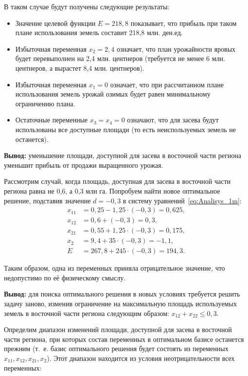 В таком случае будут получены следующие результаты:
\begin{itemize}
\item Значение целевой функции $ E = 218{,}8 $ показывает, что прибыль при таком
  плане использования земель составит 218{,}8 млн. ден.ед.
\item Избыточная переменная $ x_{2} = 2{,}4 $ означает, что план урожайности яровых 
  будет перевыполнен на 2{,}4 млн. центнеров (требуется не менее 6 млн. центнеров, а
  вырастет 8{,}4 млн. центнеров).
\item Избыточная переменная $ x_{1} = 0 $ означает, что при рассчитанном плане использования
  земель урожай озимых будет равен минимальному ограничению плана.
\item Остаточные переменные $ x_{3} = x_{4} = 0 $ означают, что для засева будут
  использованы все доступные площади (то есть неиспользуемых земель не останется).
\end{itemize}

\textbf{Вывод:} уменьшение площади, доступной для засева в восточной части региона
уменьшит прибыль от продажи выращенного урожая.


Рассмотрим случай, когда площадь, доступная для засева в восточной части региона равна не 0{,}6, а 0{,}3 млн га.
Попробуем найти новое оптимальное решение, подставив значение $ d = -0{,}3 $ в систему уравнений~\eqref{eq:Analisys_1m}:
\begin{equation}
    \begin{aligned}
      x_{11} &= 0{,}25 - 1{,}25 \cdot (-0{,}3) = 0{,}625, \\
      x_{12} &= 0{,}6 + (-0{,}3) = 0{,}3, \\
      x_{21} &= 0{,}55 + 1{,}25 \cdot (-0{,}3) = 0{,}175, \\
      x_{2} &= 9{,}4 + 35 \cdot (-0{,}3) = -1{,}1, \\
      E &= 267{,}8 + 245 \cdot (-0{,}3) = 194{,}3.
    \end{aligned}
\end{equation}

Таким образом, одна из переменных приняла отрицательное значение, что недопустимо по её физическому смыслу.

\textbf{Вывод:} для поиска оптимального решения в новых условиях требуется решить задачу заново,
изменив ограничение на максимальную площадь используемых земель в восточной части региона следующим образом:
$ x_{12} + x_{22} \le 0{,}3 $.


Определим диапазон изменений площади, доступной для засева в восточной части региона, при которых состав
переменных в оптимальном базисе останется прежним (т.~е. базис оптимального решения будет состоять из переменных
$ x_{11}, x_{12}, x_{21}, x_{2} $). Этот диапазон находится из условия неотрицательности всех переменных:


